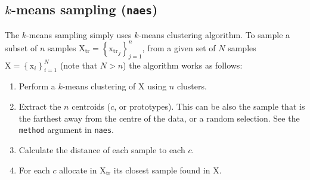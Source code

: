 \documentclass[12pt]{article}\usepackage{graphicx, color}
\newcommand{\Rfunction}[1]{{\texttt{#1}}}
\newcommand{\Rargument}[1]{{\texttt{#1}}}
\begin{document}
\subsection{$k$-means sampling (\Rfunction{naes})}

The $k$-means sampling simply uses $k$-means clustering algorithm. To sample a subset of $n$  samples $\mathrm{X_{tr}} = \left \{ \mathrm{x_{tr}}_{j} \right \}_{j=1}^{n}$, from a given set of $N$ samples $\mathrm{X} = \left \{ \mathrm{x}_i \right \}_{i=1}^{N}$ (note that $N>n$) the algorithm works as follows:  

\begin{enumerate}
  \item Perform a $k$-means clustering of $\mathrm{X}$ using $n$ clusters.   
  \item Extract the $n$ centroids ($c$, or prototypes). This can be also the sample that is the farthest away from the centre of the data, or a random selection. See the \Rargument{method} argument in \Rfunction{naes}.
  \item Calculate the distance of each sample to each $c$.  
  \item For each $c$ allocate in $\mathrm{X_{tr}}$ its closest sample found in $\mathrm{X}$.  
\end{enumerate}
\end{document}
